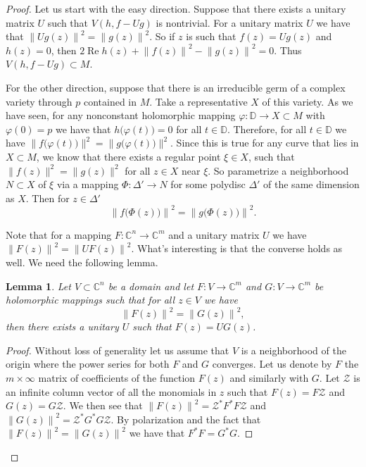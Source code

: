 \documentclass[12pt,openany]{book}
\renewcommand{\Re}{\operatorname{Re}}
\newcommand{\snorm}[1]{\lVert {#1} \rVert}
\newcommand{\norm}[1]{\left\lVert {#1} \right\rVert}
\newcommand{\C}{{\mathbb{C}}}
\newcommand{\bD}{{\mathbb{D}}}
\newcommand{\sZ}{{\mathcal{Z}}}
\theoremstyle{plain}
\newtheorem{lemma}[thm]{Lemma}
\theoremstyle{remark}
\theoremstyle{definition}
\theoremstyle{exercise}
\theoremstyle{example}
\begin{document}
\begin{proof}
Let us start with the easy direction.  Suppose that there
exists a unitary matrix $U$ such that $V(h,f-Ug)$ is
nontrivial.  For a unitary matrix $U$
we have that $\norm{Ug(z)}^2 = \norm{g(z)}^2$.  So if $z$
is such that $f(z) = Ug(z)$ and $h(z) = 0$, then
$2 \Re h(z) + \norm{f(z)}^2-\norm{g(z)}^2 = 0$.  Thus $V(h,f-Ug) \subset M$.

For the other direction, suppose that there is an irreducible germ of
a complex variety through $p$ contained in $M$.  Take a representative
$X$ of this variety.
As we have seen, for
any 
nonconstant holomorphic mapping
$\varphi \colon \bD \to X \subset M$
with $\varphi(0) = p$
we have that
$h\bigl(\varphi(t)\bigr) = 0$ for all $t \in \bD$.  Therefore,
for all $t \in \bD$ we have
$\snorm{f\bigl(\varphi(t)\bigr)}^2 = \snorm{g\bigl(\varphi(t)\bigr)}^2$.
Since this is true for any curve that lies in $X \subset M$, we know that
there exists a regular point $\xi \in X$, such that 
$\snorm{f(z)}^2 = \snorm{g(z)}^2$ for all $z \in X$ near $\xi$.
So parametrize a neighborhood $N \subset X$ of $\xi$ via a
mapping $\Phi \colon \Delta' \to N$ for some polydisc $\Delta'$ of
the same dimension as $X$.  Then for $z \in \Delta'$
\begin{equation}
\norm{f\bigl(\Phi(z)\bigr)}^2 = \norm{g\bigl(\Phi(z)\bigr)}^2 .
\end{equation}

Note that for a mapping $F \colon \C^n \to \C^m$ and
a unitary matrix $U$ we have
$\norm{F(z)}^2 = \norm{U F(z)}^2$.  What's interesting is that
the converse holds as well.  We need the following lemma.

\begin{lemma}
Let $V \subset \C^n$ be a domain and
let $F \colon V \to \C^m$ and
$G \colon V \to \C^m$ be holomorphic mappings such that
for all $z \in V$ we have
\begin{equation}
\norm{F(z)}^2 = \norm{G(z)}^2 ,
\end{equation}
then there exists a unitary $U$ such that $F(z) = U G (z)$.
\end{lemma}

\begin{proof}
Without loss of generality let us assume that $V$ is a neighborhood
of the origin where the power series for both $F$ and $G$ converges.
Let us denote by $F$ the $m \times \infty$ matrix of coefficients
of the function $F(z)$ and similarly with $G$.  
Let $\sZ$ is an infinite column vector of all the monomials in $z$
such that $F(z) = F \sZ$ and
$G(z) = G \sZ$.  We then see that
$\norm{F(z)}^2 = \sZ^* F^* F \sZ$
and
$\norm{G(z)}^2 = \sZ^* G^* G \sZ$.  By polarization and the fact that
$\norm{F(z)}^2 = \norm{G(z)}^2$ we have that
$F^*F = G^*G$.


\end{proof}
\end{proof}
\end{document}
